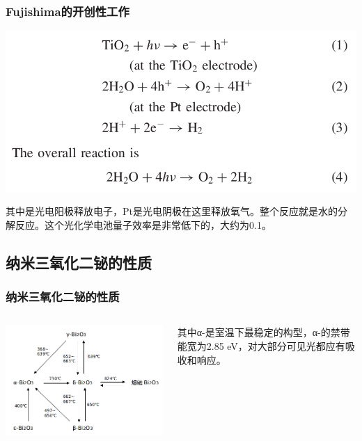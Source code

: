 \documentclass[xetex,compress]{mybeamer}
\begin{document}
\begin{frame}
\frametitle{Fujishima的开创性工作}
\begin{block}{}
\centering
\includegraphics[scale=0.3]{figures/光分解水化学反应式} 
\end{block}
\begin{block}{}
其中是光电阳极释放电子，Pt是光电阴极在这里释放氧气。整个反应就是水的分解反应。这个光化学电池量子效率是非常低下的，大约为0.1。
\end{block}
\end{frame}

\subsection{纳米三氧化二铋的性质}
\begin{frame}
\frametitle{纳米三氧化二铋的性质}
\begin{columns}
\begin{block}{}
\centering
\includegraphics[width=\linewidth]{figures/Bi2O3转变温度} 
\end{block}
\begin{block}{}
其中α-是室温下最稳定的构型，α-的禁带能宽为2.85 eV，对大部分可见光都应有吸收和响应。
\end{block}
\end{columns}
\end{frame}
\end{document}
